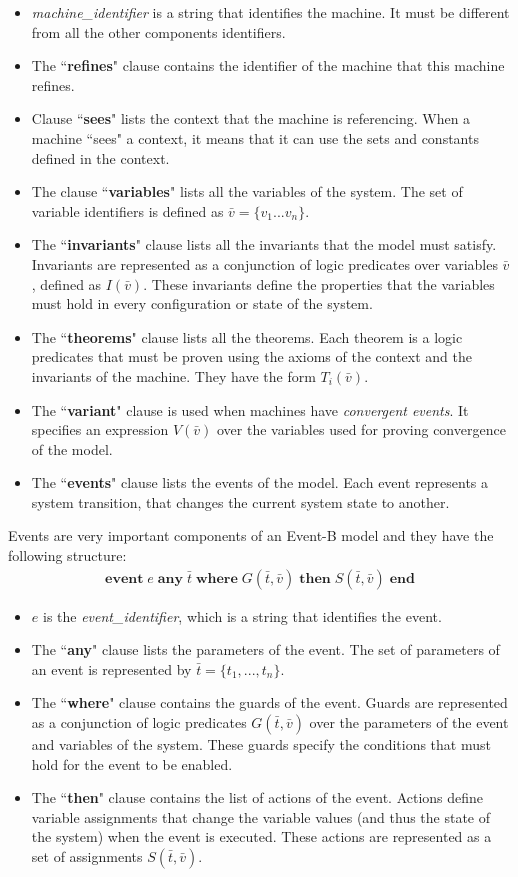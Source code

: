 \begin{itemize}
    \item \textit{machine\_identifier} is a string that identifies the machine. It must be different from all the other components identifiers.
    \item The ``\textbf{refines}" clause contains the identifier of the machine that this machine refines.
    \item Clause ``\textbf{sees}" lists the context that the machine is referencing. When a machine ``sees" a context, it means that it can use the sets and constants defined in the context.
    \item The clause ``\textbf{variables}" lists all the variables of the system. The set of variable identifiers is defined as $\bar{v} = \{v_1...v_n\}$.
    \item The ``\textbf{invariants}" clause lists all the invariants that the model must satisfy. Invariants are represented as a conjunction of logic predicates over variables $\bar{v}$, defined as $I(\bar{v})$. These invariants define the properties that the variables must hold in every configuration or state of the system.
    \item The ``\textbf{theorems}" clause lists all the theorems. Each theorem is a logic predicates that must be proven using the axioms of the context and the invariants of the machine. They have the form $T_i(\bar{v})$.
    \item The ``\textbf{variant}" clause is used when machines have \textit{convergent events}. It specifies an expression $V(\bar{v})$ over the variables used for proving convergence of the model.
    \item The ``\textbf{events}" clause lists the events of the model. Each event represents a system transition, that changes the current system state to another.
\end{itemize}
Events are very important components of an Event-B model and they have the following structure:
\begin{align*}
    \textbf{event} \; e \; \textbf{any} \; \bar{t} \; \textbf{where} \; G(\bar{t}, \bar{v}) \; \textbf{then} \; S(\bar{t}, \bar{v}) \; \textbf{end} 
\end{align*}
\begin{itemize}
    \item $e$ is the \textit{event\_identifier}, which is a string that identifies the event.
    \item The ``\textbf{any}" clause lists the parameters of the event. The set of parameters of an event is represented by $\bar{t} = \{t_1,...,t_n\}$.
    \item The ``\textbf{where}" clause contains the guards of the event. Guards are represented as a conjunction of logic predicates $G(\bar{t}, \bar{v})$ over the parameters of the event and variables of the system. These guards specify the conditions that must hold for the event to be enabled.
    \item The ``\textbf{then}" clause contains the list of actions of the event. Actions define variable assignments that change the variable values (and thus the state of the system) when the event is executed. These actions are represented as a set of assignments $S(\bar{t}, \bar{v})$.
\end{itemize} 
